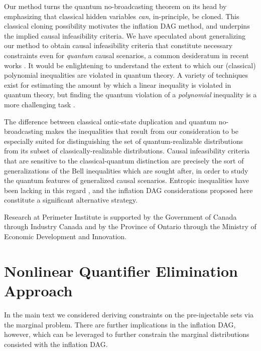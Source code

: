 Our method turns the quantum no-broadcasting theorem \cite{NoCloningQuantum1996,NoCloningGeneral2006} on its head by emphasizing that classical hidden variables \emph{can}, in-principle, be cloned. This classical cloning possibility motivates the inflation DAG method, and underpins the implied causal infeasibility criteria. We have speculated about generalizing our method to obtain causal infeasibility criteria that constitute necessary constraints even for \emph{quantum} causal scenarios, a common desideratum in recent works \cite{fritz2012bell,pusey2014gdag,Chaves2015infoquantum,ChavesNoSignalling,BeyondBellII}. It would be enlightening to understand the extent to which our (classical) polynomial inequalities are violated in quantum theory. A variety of techniques exist for estimating the amount by which a linear inequality \cite{NPA2008Long,I3322NPA1} is violated in quantum theory, but finding the quantum violation of a \emph{polynomial} inequality is a more challenging task \cite{NPAReview}.

The difference between classical ontic-state duplication and quantum no-broadcasting makes the inequalities that result from our consideration to be especially suited for distinguishing the set of quantum-realizable distributions from its subset of classically-realizable distributions. Causal infeasibility criteria that are sensitive to the classical-quantum distinction are precisely the sort of generalizations of the Bell inequalities which are sought after, in order to study the quantum features of generalized causal scenarios. Entropic inequalities have been lacking in this regard \cite{fritz2012bell,pusey2014gdag,Chaves2015infoquantum}, and the inflation DAG considerations proposed here constitute a significant alternative strategy.





\begin{acknowledgments}
Research at Perimeter Institute is supported by the Government of Canada through Industry Canada and by the Province of Ontario through the Ministry of Economic Development and Innovation.
\end{acknowledgments}


\onecolumngrid
\appendix
\renewcommand{\theequation}{A-\arabic{equation}}
\setcounter{equation}{0}

\section{Nonlinear Quantifier Elimination Approach}\label{sec:nonlinearelimination}
In the main text we considered deriving constraints on the pre-injectable sets via the marginal problem. There are further implications in the inflation DAG, however, which can be leveraged to further constrain the marginal distributions consisted with the inflation DAG.

